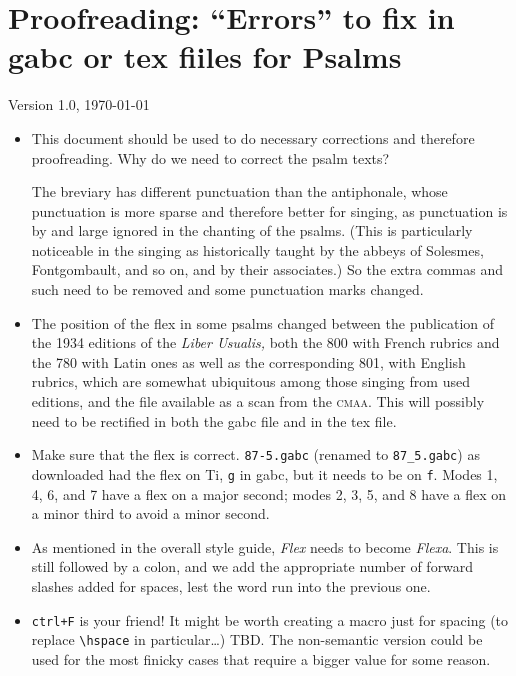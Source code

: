\documentclass[11pt]{article}
\begin{document}
 \section{Proofreading: ``Errors'' to fix in gabc or tex fiiles for Psalms}
 
 {\centering Version 1.0, \today\par}
 
\begin{itemize}
 \item
 This document should be used to do necessary corrections and therefore proofreading. Why do we need to correct the psalm texts?
 
The breviary has different punctuation than the antiphonale, whose punctuation is more sparse and therefore better for singing, as punctuation is by and large ignored in the chanting of the psalms. (This is particularly noticeable in the singing as historically taught by the abbeys of Solesmes, Fontgombault, and so on, and by their associates.) So the extra commas and such need to be removed and some punctuation marks changed.
 
 \item
 The position of the flex in some psalms changed between the publication of the 1934 editions of the \textit{Liber Usualis,} both the 800 with French rubrics and the 780 with Latin ones as well as the corresponding 801, with English rubrics, which are somewhat ubiquitous among those singing from used editions, and the file available as a scan from the \textsc{cmaa}. This will possibly need to be rectified in both the gabc file and in the tex file.
 
 \item
 
 Make sure that the flex is correct. \verb|87-5.gabc| (renamed to \verb|87_5.gabc|) as downloaded had the flex on Ti, \verb|g| in gabc, but it needs to be on \verb|f|. Modes 1, 4, 6, and 7 have a flex on a major second; modes 2, 3, 5, and 8 have a flex on a minor third to avoid a minor second.

 \item
 As mentioned in the overall style guide, \textit{Flex} needs to become \textit{Flexa}. This is still followed by a colon, and we add the appropriate number of forward slashes added for spaces, lest the word run into the previous one. 

 \item
\texttt{ctrl+F} is your friend! It might be worth creating a macro just for spacing (to replace \verb|\hspace| in particular…) TBD. The non-semantic version could be used for the most finicky cases that require a bigger value for some reason.


\end{itemize}
\end{document}
